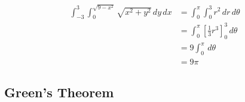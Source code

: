 \documentclass{article}
\begin{document}
\setcounter{subsubsection}{24}
\subsubsection{}

\begin{align*}
  \int_{-3}^3 \int_0^{\sqrt{9 - x^2}} \sqrt{x^2 + y^2} \,dy \,dx & = \int_0^\pi \int_0^3 r^2 \,dr \,d\theta                  \\
                                                                 & = \int_0^\pi \left[ \frac{1}{3} r^3 \right]_0^3 \,d\theta \\
                                                                 & = 9 \int_0^\pi \,d\theta                                  \\
                                                                 & = 9 \pi
\end{align*}

\subsection{Green’s Theorem}

\subsubsection{}
\end{document}

